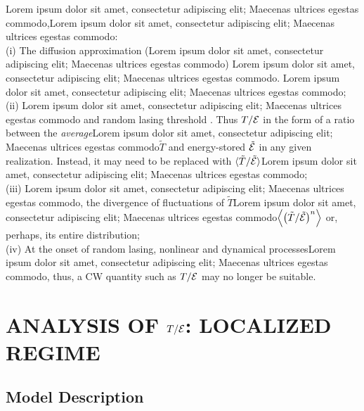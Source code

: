 Lorem ipsum dolor sit amet, consectetur adipiscing elit; Maecenas ultrices egestas commodo,Lorem ipsum dolor sit amet, consectetur adipiscing elit; Maecenas ultrices egestas commodo:\\
(i) The diffusion approximation (Lorem ipsum dolor sit amet, consectetur adipiscing elit; Maecenas ultrices egestas commodo) Lorem ipsum dolor sit amet, consectetur adipiscing elit; Maecenas ultrices egestas commodo. Lorem ipsum dolor sit amet, consectetur adipiscing elit; Maecenas ultrices egestas commodo;\\
(ii) Lorem ipsum dolor sit amet, consectetur adipiscing elit; Maecenas ultrices egestas commodo\cite{2005_Yamilov_correlations} and random lasing threshold \cite{1995_zyuzin_fluctuations}. Thus $T/{\cal E}$ in the form of a ratio between the {\it average}Lorem ipsum dolor sit amet, consectetur adipiscing elit; Maecenas ultrices egestas commodo$\tilde{T}$ and energy-stored $\tilde{\cal E}$ in any given realization. Instead, it may need to be replaced with $\langle \tilde{T}/\tilde{\cal E}\rangle$Lorem ipsum dolor sit amet, consectetur adipiscing elit; Maecenas ultrices egestas commodo;\\
(iii) Lorem ipsum dolor sit amet, consectetur adipiscing elit; Maecenas ultrices egestas commodo, the divergence of fluctuations of $\tilde{T}$Lorem ipsum dolor sit amet, consectetur adipiscing elit; Maecenas ultrices egestas commodo$\left\langle \left(\tilde{T}/\tilde{\cal E}\right)^n\right\rangle$ or, perhaps, its entire distribution; \\
(iv) At the onset of random lasing, nonlinear and dynamical processes\cite{2005_Cao,2009_Deych_random_laser_theory,2008_Stone,2008_Conti_opals,2009_Frank}Lorem ipsum dolor sit amet, consectetur adipiscing elit; Maecenas ultrices egestas commodo, thus, a CW quantity such as $T/{\cal E}$ may no longer be suitable.

\section{ANALYSIS OF \texorpdfstring{$T/{\cal E}$}{T/E}: LOCALIZED REGIME}
\label{sec:localization_passive}

\subsection{Model Description}
\label{sec:numerical_model}

